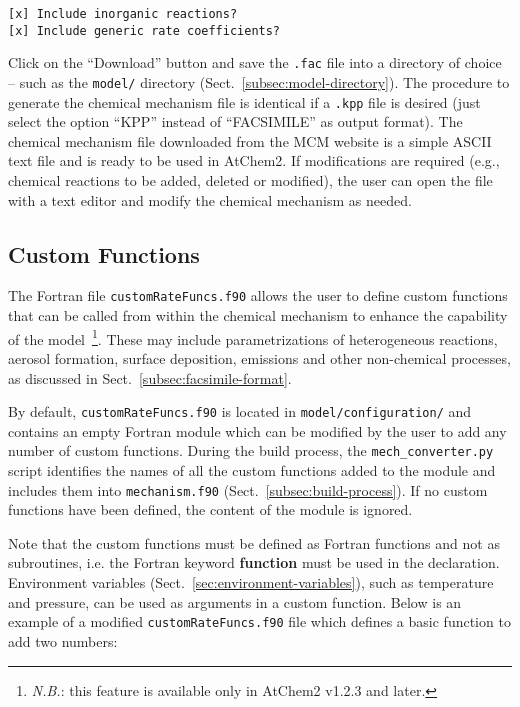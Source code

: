 \begin{verbatim}
[x] Include inorganic reactions?
[x] Include generic rate coefficients?
\end{verbatim}

Click on the ``Download'' button and save the \texttt{.fac} file into
a directory of choice -- such as the \texttt{model/} directory
(Sect.~\ref{subsec:model-directory}). The procedure to generate the
chemical mechanism file is identical if a \texttt{.kpp} file is
desired (just select the option ``KPP'' instead of ``FACSIMILE'' as
output format). The chemical mechanism file downloaded from the MCM
website is a simple ASCII text file and is ready to be used in
AtChem2. If modifications are required (e.g., chemical reactions to be
added, deleted or modified), the user can open the file with a text
editor and modify the chemical mechanism as needed.

\subsection{Custom Functions} \label{subsec:custom-functions}

The Fortran file \texttt{customRateFuncs.f90} allows the user to
define custom functions that can be called from within the chemical
mechanism to enhance the capability of the model~\footnote{\emph{N.B.}:
  this feature is available only in AtChem2 v1.2.3 and later.}.
These may include parametrizations of heterogeneous reactions, aerosol
formation, surface deposition, emissions and other non-chemical
processes, as discussed in Sect.~\ref{subsec:facsimile-format}.

By default, \texttt{customRateFuncs.f90} is located in
\texttt{model/configuration/} and contains an empty Fortran module
which can be modified by the user to add any number of custom
functions. During the build process, the \texttt{mech\_converter.py}
script identifies the names of all the custom functions added to the
module and includes them into \texttt{mechanism.f90}
(Sect.~\ref{subsec:build-process}). If no custom functions have been
defined, the content of the module is ignored.

Note that the custom functions must be defined as Fortran functions
and not as subroutines, i.e. the Fortran keyword \textbf{function}
must be used in the declaration. Environment variables
(Sect.~\ref{sec:environment-variables}), such as temperature and
pressure, can be used as arguments in a custom function. Below is an
example of a modified \texttt{customRateFuncs.f90} file which defines
a basic function to add two numbers:

